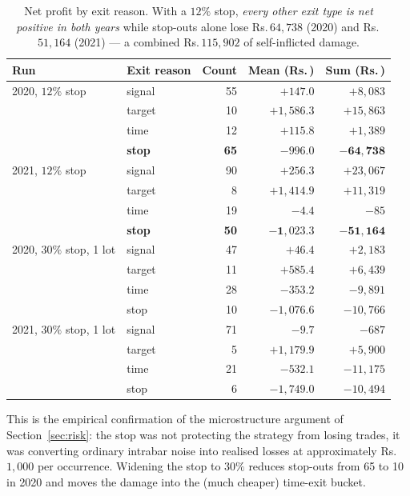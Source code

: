 \documentclass[11pt,a4paper]{article}
\newcommand{\rs}{Rs.\,}                 %
\begin{document}
\begin{table}[H]
\centering\small
\begin{tabular}{@{}llrrr@{}}
\toprule
\textbf{Run} & \textbf{Exit reason} & \textbf{Count} & \textbf{Mean (\rs)} & \textbf{Sum (\rs)}\\
\midrule
2020, $12\%$ stop & signal & 55 & $+147.0$ & $+8{,}083$\\
                  & target & 10 & $+1{,}586.3$ & $+15{,}863$\\
                  & time   & 12 & $+115.8$ & $+1{,}389$\\
                  & \textbf{stop} & \textbf{65} & $\mathbf{-996.0}$ & $\mathbf{-64{,}738}$\\
\midrule
2021, $12\%$ stop & signal & 90 & $+256.3$ & $+23{,}067$\\
                  & target &  8 & $+1{,}414.9$ & $+11{,}319$\\
                  & time   & 19 & $-4.4$ & $-85$\\
                  & \textbf{stop} & \textbf{50} & $\mathbf{-1{,}023.3}$ & $\mathbf{-51{,}164}$\\
\midrule
2020, $30\%$ stop, 1 lot & signal & 47 & $+46.4$ & $+2{,}183$\\
                  & target & 11 & $+585.4$ & $+6{,}439$\\
                  & time   & 28 & $-353.2$ & $-9{,}891$\\
                  & stop   & 10 & $-1{,}076.6$ & $-10{,}766$\\
\midrule
2021, $30\%$ stop, 1 lot & signal & 71 & $-9.7$ & $-687$\\
                  & target &  5 & $+1{,}179.9$ & $+5{,}900$\\
                  & time   & 21 & $-532.1$ & $-11{,}175$\\
                  & stop   &  6 & $-1{,}749.0$ & $-10{,}494$\\
\bottomrule
\end{tabular}
\caption{Net profit by exit reason. With a $12\%$ stop, \emph{every other exit type is
net positive in both years} while stop-outs alone lose \rs$64{,}738$ (2020) and
\rs$51{,}164$ (2021) --- a combined \rs$115{,}902$ of self-inflicted damage.}
\label{tab:exits}
\end{table}

This is the empirical confirmation of the microstructure argument of
Section~\ref{sec:risk}: the stop was not protecting the strategy from losing trades, it
was converting ordinary intrabar noise into realised losses at approximately \rs$1{,}000$
per occurrence. Widening the stop to $30\%$ reduces stop-outs from 65 to 10 in 2020 and
moves the damage into the (much cheaper) time-exit bucket.
\end{document}
